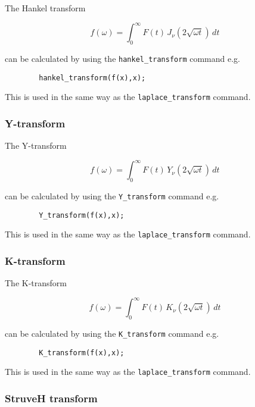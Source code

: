 The Hankel transform

\begin{displaymath}
f(\omega) = \int_{0}^{\infty} F(t) \,J_{\nu}(2\sqrt{\omega t}) \,dt 
\end{displaymath}

can be calculated by using the \verb+hankel_transform+ command e.g.

\begin{verbatim}
        hankel_transform(f(x),x);
\end{verbatim}

This is used in the same way as the \verb+laplace_transform+ command.

\subsubsection{Y-transform}

The Y-transform

\begin{displaymath}
f(\omega) = \int_{0}^{\infty} F(t) \,Y_{\nu}(2\sqrt{\omega t}) \,dt 
\end{displaymath}

can be calculated by using the \verb+Y_transform+ command e.g.

\begin{verbatim}
        Y_transform(f(x),x);    
\end{verbatim}

This is used in the same way as the \verb+laplace_transform+ command.

\subsubsection{K-transform}

The K-transform

\begin{displaymath}
f(\omega) = \int_{0}^{\infty} F(t) \,K_{\nu}(2\sqrt{\omega t}) \,dt
\end{displaymath}

can be calculated by using the \verb+K_transform+ command e.g.

\begin{verbatim}
        K_transform(f(x),x);    
\end{verbatim}

This is used in the same way as the \verb+laplace_transform+ command.

\subsubsection{StruveH transform}


